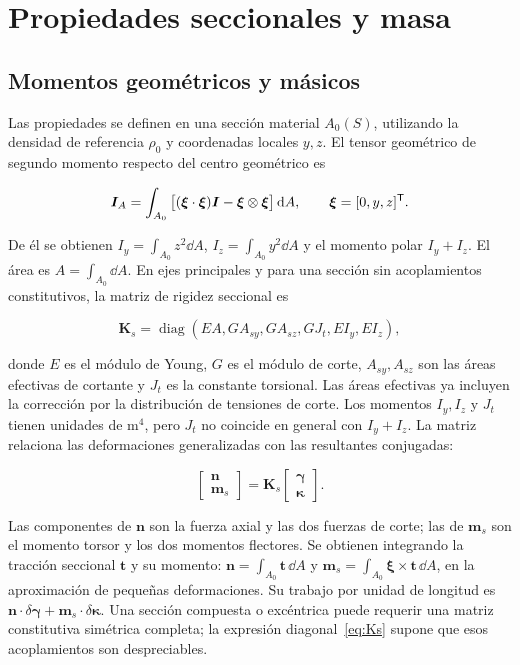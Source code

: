 \FloatBarrier
\section{Propiedades seccionales y masa}
\subsection{Momentos geométricos y másicos}
Las propiedades se definen en una sección material $A_0(S)$, utilizando la densidad de referencia $\rho_0$ y coordenadas locales $y,z$. El tensor geométrico de segundo momento respecto del centro geométrico es

\begin{equation}
\bm I_A=\int_{A_0}
\big[(\bm\xi\cdot\bm\xi)\bm I-\bm\xi\otimes\bm\xi\big]\,\mathrm d A,
\qquad \bm\xi=[0,y,z]^\mathsf T.
\end{equation}

De él se obtienen $I_y=\int_{A_0}z^2\dd A$, $I_z=\int_{A_0}y^2\dd A$ y el momento polar $I_y+I_z$. El área es $A=\int_{A_0}\dd A$. En ejes principales y para una sección sin acoplamientos constitutivos, la matriz de rigidez seccional es

\begin{equation}
\bm K_s=\operatorname{diag}(EA,GA_{sy},GA_{sz},GJ_t,EI_y,EI_z),
\label{eq:Ks}
\end{equation}

donde $E$ es el módulo de Young, $G$ es el módulo de corte, $A_{sy},A_{sz}$ son las áreas efectivas de cortante y $J_t$ es la constante torsional. Las áreas efectivas ya incluyen la corrección por la distribución de tensiones de corte. Los momentos $I_y,I_z$ y $J_t$ tienen unidades de $\mathrm{m^4}$, pero $J_t$ no coincide en general con $I_y+I_z$. La matriz relaciona las deformaciones generalizadas con las resultantes conjugadas:

\begin{equation}
\begin{bmatrix}\bm n\\\bm m_s\end{bmatrix}
=\bm K_s\begin{bmatrix}\bm\gamma\\\bm\kappa\end{bmatrix}.
\label{eq:constitutiva}
\end{equation}

Las componentes de $\bm n$ son la fuerza axial y las dos fuerzas de corte; las de $\bm m_s$ son el momento torsor y los dos momentos flectores. Se obtienen integrando la tracción seccional $\bm t$ y su momento: $\bm n=\int_{A_0}\bm t\,\dd A$ y $\bm m_s=\int_{A_0}\bm\xi\times\bm t\,\dd A$, en la aproximación de pequeñas deformaciones. Su trabajo por unidad de longitud es $\bm n\cdot\delta\bm\gamma+\bm m_s\cdot\delta\bm\kappa$. Una sección compuesta o excéntrica puede requerir una matriz constitutiva simétrica completa; la expresión diagonal~\eqref{eq:Ks} supone que esos acoplamientos son despreciables.

